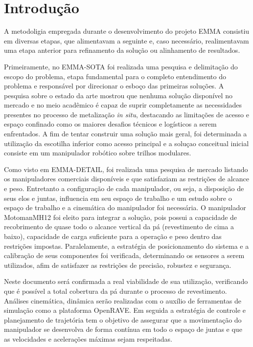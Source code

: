 \section{Introdução}

A metodoligia empregada durante o desenvolvimento do projeto EMMA consistiu em
diversas etapas, que alimentavam a seguinte e, caso necessário,
realimentavam uma etapa anterior para refinamento da solução ou alinhamento de
resultados. 

Primeiramente, no EMMA-SOTA foi realizada uma pesquisa e delimitação
do escopo do problema, etapa fundamental para o completo entendimento do
problema e responsável por direcionar o esboço das primeiras soluções. A
pesquisa sobre o estado da arte mostrou que nenhuma solução disponível no
mercado e no meio acadêmico é capaz de suprir completamente as necessidades
presentes no processo de metalização \textit{in situ}, destacando as limitações
de acesso e espaço confinado como os maiores desafios técnicos e logísticos a
serem enfrentados. A fim de tentar construir uma solução mais geral, foi
determinada a utilização da escotilha inferior como acesso principal e a soluçao
conceitual inicial consiste em um manipulador robótico sobre trilhos modulares.

Como visto em EMMA-DETAIL,  foi realizada uma pesquisa de mercado listando os
manipuladores comerciais disponíveis e que satisfaziam as restrições de alcance
e peso. Entretanto a configuração de cada manipulador, ou seja, a disposição
de seus elos e juntas, influencia em seu espaço de trabalho e um estudo sobre o
espaço de trabalho e a cinemática do manipulador foi necessária. O
manipulador Motoman\textregistered MH12 foi eleito para integrar a solução, pois
possui a capacidade de recobrimento de quase todo o alcance vertical da pá
(revestimento de cima a baixo), capacidade de carga suficiente para a operação e peso dentro das
restrições impostas. Paralelamente, a estratégia de posicionamento do sistema e
a calibração de seus componentes foi verificada, determinando os sensores a
serem utilizados, afim de satisfazer as restrições de precisão, robustez e
segurança.

Neste documento será confirmada a real viabilidade de
sua utilização, verificando que é possível a total cobertura da pá durante o
processo de revestimento. Análises cinemática, dinâmica serão realizadas com
o auxílio de ferramentas de simulação como a plataforma OpenRAVE. Em seguida a
estratégia de controle e planejamento de trajetória tem o objetivo de assegurar
que a movimentação do manipulador se desenvolva de forma contínua em todo o
espaço de juntas e que as velocidades e acelerações máximas sejam respeitadas.

